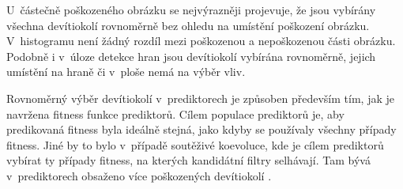 U~částečně poškozeného obrázku se nejvýrazněji projevuje, že jsou vybírány všechna devítiokolí rovnoměrně bez ohledu na umístění poškození obrázku. V~histogramu není žádný rozdíl mezi poškozenou a nepoškozenou části obrázku. Podobně i v~úloze detekce hran jsou devítiokolí vybírána rovnoměrně, jejich umístění na hraně či v~ploše nemá na výběr vliv.

Rovnoměrný výběr devítiokolí v~prediktorech je způsoben především tím, jak je navržena fitness funkce prediktorů. Cílem populace prediktorů je, aby predikovaná fitness byla ideálně stejná, jako kdyby se používaly všechny případy fitness. Jiné by to bylo v~případě soutěživé koevoluce, kde je cílem prediktorů vybírat ty případy fitness, na kterých kandidátní filtry selhávají. Tam bývá v~prediktorech obsaženo více poškozených devítiokolí \cite{SikuPPSN}.

